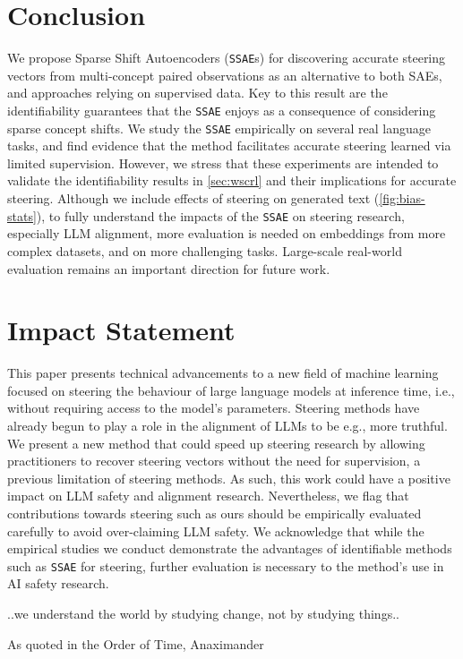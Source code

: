 \documentclass{article}
\newcommand{\isae}{\texttt{SSAE}\xspace}
\begin{document}
\section{Conclusion}
We propose Sparse Shift Autoencoders ({\isae}s) for discovering accurate steering vectors from multi-concept paired observations as an alternative to both SAEs, and approaches relying on supervised data. Key to this result are the identifiability guarantees that the \isae enjoys as a consequence of considering sparse concept shifts. We study the \isae empirically on several real language tasks, and find evidence that the method facilitates accurate steering learned via limited supervision. However, we stress that these experiments are intended to validate the identifiability results in \cref{sec:wscrl} and their implications for accurate steering. Although we include effects of steering on generated text (\cref{fig:bias-stats}), to fully understand the impacts of the \isae on steering research, especially LLM alignment, more evaluation is needed on embeddings from more complex datasets, and on more challenging tasks. Large-scale real-world evaluation remains an important direction for future work.

\section*{Impact Statement}
\label{sec:impact}
This paper presents technical advancements to a new field of machine learning focused on steering the behaviour of large language models at inference time, i.e., without requiring access to the model's parameters. Steering methods have already begun to play a role in the alignment of LLMs to be e.g., more truthful. We present a new method that could speed up steering research by allowing practitioners to recover steering vectors without the need for supervision, a previous limitation of steering methods. As such, this work could have a positive impact on LLM safety and alignment research. Nevertheless, we flag that contributions towards steering such as ours should be empirically evaluated carefully to avoid over-claiming LLM safety. We acknowledge that while the empirical studies we conduct demonstrate the advantages of identifiable methods such as \isae for steering, further evaluation is necessary to the method's use in AI safety research.




\newpage
\appendix
\onecolumn
\epigraph{..we understand the world by studying change, not by studying things..}{As quoted in the Order of Time, Anaximander}
\tableofcontents
\newpage
\end{document}
